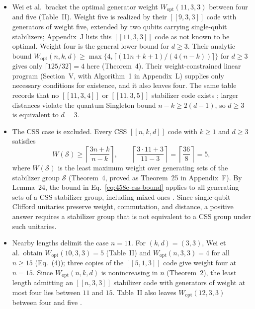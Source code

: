 \begin{itemize}
  \item Wei et al.\ bracket the optimal generator weight $W_{\mathrm{opt}}(11,3,3)$ between four and five (Table~II). Weight five is realized by their $[[9,3,3]]$ code with generators of weight five, extended by two qubits carrying single-qubit stabilizers; Appendix~J lists this $[[11,3,3]]$ code as not known to be optimal. Weight four is the general lower bound for $d\geq3$. Their analytic bound $W_{\mathrm{opt}}(n,k,d)\geq\max\{4,\lceil(11n+k+1)/(4(n-k))\rceil\}$ for $d\geq3$ gives only $\lceil125/32\rceil=4$ here (Theorem~4). Their weight-constrained linear program (Section~V, with Algorithm~1 in Appendix~L) supplies only necessary conditions for existence, and it also leaves four. The same table records that no $[[11,3,4]]$ or $[[11,3,5]]$ stabilizer code exists ; larger distances violate the quantum Singleton bound $n-k\geq2(d-1)$, so $d\geq3$ is equivalent to $d=3$.

  \item The CSS case is excluded. Every CSS $[[n,k,d]]$ code with $k\geq1$ and $d\geq3$ satisfies
\begin{equation}
  W(\mathcal S)\geq\left\lceil\frac{3n+k}{n-k}\right\rceil,
  \qquad
  \left\lceil\frac{3\cdot11+3}{11-3}\right\rceil=\left\lceil\frac{36}{8}\right\rceil=5,
  \label{eq:458e-css-bound}
\end{equation}
where $W(\mathcal S)$ is the least maximum weight over generating sets of the stabilizer group $\mathcal S$ (Theorem~4, proved as Theorem~25 in Appendix~F). By Lemma~24, the bound in Eq.~\eqref{eq:458e-css-bound} applies to all generating sets of a CSS stabilizer group, including mixed ones . Since single-qubit Clifford unitaries preserve weight, commutation, and distance, a positive answer requires a stabilizer group that is not equivalent to a CSS group under such unitaries.

  \item Nearby lengths delimit the case $n=11$. For $(k,d)=(3,3)$, Wei et al.\ obtain $W_{\mathrm{opt}}(10,3,3)=5$ (Table~II) and $W_{\mathrm{opt}}(n,3,3)=4$ for all $n\geq15$ (Eq.~(4)); three copies of the $[[5,1,3]]$ code give weight four at $n=15$. Since $W_{\mathrm{opt}}(n,k,d)$ is nonincreasing in $n$ (Theorem~2), the least length admitting an $[[n,3,3]]$ stabilizer code with generators of weight at most four lies between $11$ and $15$. Table~II also leaves $W_{\mathrm{opt}}(12,3,3)$ between four and five .


\end{itemize}
